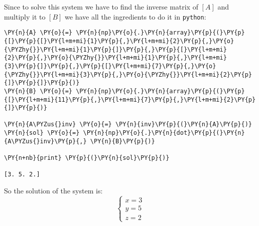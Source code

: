 Since to solve this system we have to find the inverse matrix of \([A]\)
and multiply it to \([B]\) we have all the ingredients to do it in
\texttt{python}:

    \begin{tcolorbox}[breakable, size=fbox, boxrule=1pt, pad at break*=1mm,colback=cellbackground, colframe=cellborder]
\begin{Verbatim}[commandchars=\\\{\}]
\PY{n}{A} \PY{o}{=} \PY{n}{np}\PY{o}{.}\PY{n}{array}\PY{p}{(}\PY{p}{[}\PY{p}{[}\PY{l+m+mi}{1}\PY{p}{,}\PY{l+m+mi}{2}\PY{p}{,}\PY{o}{\PYZhy{}}\PY{l+m+mi}{1}\PY{p}{]}\PY{p}{,}\PY{p}{[}\PY{l+m+mi}{2}\PY{p}{,}\PY{o}{\PYZhy{}}\PY{l+m+mi}{1}\PY{p}{,}\PY{l+m+mi}{3}\PY{p}{]}\PY{p}{,}\PY{p}{[}\PY{l+m+mi}{7}\PY{p}{,}\PY{o}{\PYZhy{}}\PY{l+m+mi}{3}\PY{p}{,}\PY{o}{\PYZhy{}}\PY{l+m+mi}{2}\PY{p}{]}\PY{p}{]}\PY{p}{)}
\PY{n}{B} \PY{o}{=} \PY{n}{np}\PY{o}{.}\PY{n}{array}\PY{p}{(}\PY{p}{[}\PY{l+m+mi}{11}\PY{p}{,}\PY{l+m+mi}{7}\PY{p}{,}\PY{l+m+mi}{2}\PY{p}{]}\PY{p}{)}

\PY{n}{A\PYZus{}inv} \PY{o}{=} \PY{n}{inv}\PY{p}{(}\PY{n}{A}\PY{p}{)}
\PY{n}{sol} \PY{o}{=} \PY{n}{np}\PY{o}{.}\PY{n}{dot}\PY{p}{(}\PY{n}{A\PYZus{}inv}\PY{p}{,} \PY{n}{B}\PY{p}{)}

\PY{n+nb}{print} \PY{p}{(}\PY{n}{sol}\PY{p}{)}

[3. 5. 2.]
    \end{Verbatim}
\end{tcolorbox}

    So the solution of the system is: \[
\begin{cases}
x=3\\
y=5\\
z=2
\end{cases}
\]
